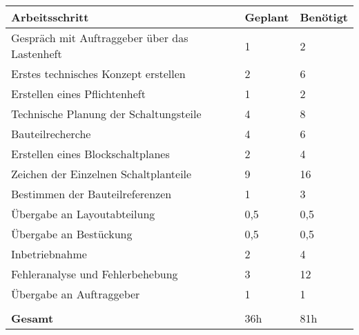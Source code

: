 \begin{tabularx}{\textwidth}{p{}|  p{} | p{}}

\textbf{Arbeitsschritt} 	&	\textbf{Geplant}	&	\textbf{Benötigt}	\\

\hline

Gespräch mit Auftraggeber über das Lastenheft	&	1	&	2\\

\hline

Erstes technisches Konzept erstellen			&	2	&	6\\

\hline

Erstellen eines Pflichtenheft					&	1	&	2\\

\hline 

Technische Planung der Schaltungsteile			&	4	&	8\\

\hline 

Bauteilrecherche  								&	4	&	6\\

\hline

Erstellen eines Blockschaltplanes				&	2	&	4\\

\hline

Zeichen der Einzelnen Schaltplanteile			&	9	&	16\\

\hline 

Bestimmen der Bauteilreferenzen					&	1	&	3\\

\hline

Übergabe an Layoutabteilung						&	0,5	&	0,5\\

\hline

Übergabe an Bestückung							&	0,5	&	0,5\\

\hline

Inbetriebnahme									&	2	&	4\\

\hline

Fehleranalyse und Fehlerbehebung				&	3	&	12\\

\hline 

Übergabe an Auftraggeber						&	1	&	1\\

&&\\

\textbf{Gesamt}	&	36h		&	81h

\end{tabularx}
\renewcommand{\arraystretch}{1}